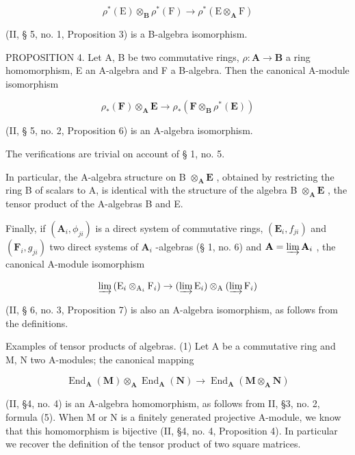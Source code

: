 \[
\rho^ {*} (\mathrm{E}) \otimes_ {\mathbf {B}} \rho^ {*} (\mathrm{F}) \rightarrow \rho^ {*} (\mathrm{E} \otimes_ {\mathbf {A}} \mathrm{F})
\]

(II, § 5, no. 1, Proposition 3) is a B-algebra isomorphism.

PROPOSITION 4. Let A, B be two commutative rings, \(\rho: \mathbf{A} \to \mathbf{B}\) a ring homomorphism, E an A-algebra and F a B-algebra. Then the canonical A-module isomorphism

\[
\rho_ {*} (\mathbf {F}) \otimes_ {\mathbf {A}} \mathbf {E} \rightarrow \rho_ {*} (\mathbf {F} \otimes_ {\mathbf {B}} \rho^ {*} (\mathbf {E}))
\]

(II, § 5, no. 2, Proposition 6) is an A-algebra isomorphism.

The verifications are trivial on account of § 1, no. 5.

In particular, the A-algebra structure on B \(\otimes_{\mathbf{A}} \mathbf{E}\) , obtained by restricting the ring B of scalars to A, is identical with the structure of the algebra B \(\otimes_{\mathbf{A}} \mathbf{E}\) , the tensor product of the A-algebras B and E.

Finally, if \((\mathbf{A}_i, \phi_{ji})\) is a direct system of commutative rings, \((\mathbf{E}_i, f_{ji})\) and \((\mathbf{F}_i, g_{ji})\) two direct systems of \(\mathbf{A}_i\) -algebras (§ 1, no. 6) and \(\mathbf{A} = \varinjlim \mathbf{A}_i\) , the canonical A-module isomorphism

\[
\varinjlim \left(\mathrm{E} _ {i} \otimes_ {\mathrm{A} _ {i}} \mathrm{F} _ {i}\right)\rightarrow (\varinjlim \mathrm{E} _ {i}) \otimes_ {\mathrm{A}} (\varinjlim \mathrm{F} _ {i})
\]

(II, § 6, no. 3, Proposition 7) is also an A-algebra isomorphism, as follows from the definitions.

Examples of tensor products of algebras. (1) Let A be a commutative ring and M, N two A-modules; the canonical mapping

\[
\operatorname{End} _ {\mathbf {A}} (\mathbf {M}) \otimes_ {\mathbf {A}} \operatorname{End} _ {\mathbf {A}} (\mathbf {N}) \rightarrow \operatorname{End} _ {\mathbf {A}} (\mathbf {M} \otimes_ {\mathbf {A}} \mathbf {N})\tag{2}
\]

(II, §4, no. 4) is an A-algebra homomorphism, as follows from II, §3, no. 2, formula (5). When M or N is a finitely generated projective A-module, we know that this homomorphism is bijective (II, §4, no. 4, Proposition 4). In particular we recover the definition of the tensor product of two square matrices.

